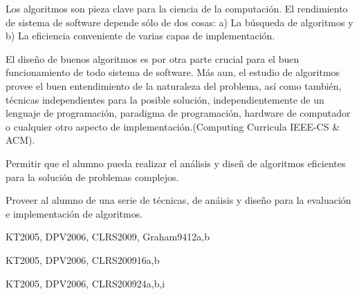 \begin{syllabus}


\begin{justification}
Los algoritmos son pieza clave para la ciencia de la computación. 
El rendimiento de sistema de software
depende sólo de dos cosas: a) La búsqueda de  algoritmos y b) La
eficiencia conveniente de varias capas de implementación.

El diseño de buenos algoritmos es por otra parte crucial para el
buen funcionamiento de todo sistema de software. Más aun, el
estudio  de algoritmos provee el buen entendimiento de la
naturaleza  del problema, así­ como también, técnicas
independientes para la posible solución, independientemente de un
lenguaje de programación, paradigma de programación, hardware de
computador o cualquier otro aspecto de implementación.(Computing
Curricula IEEE-CS \& ACM).
\end{justification}

\begin{goals}
 \item Permitir que el alumno pueda realizar el análisis y diseñ
de algoritmos eficientes para la solución de problemas complejos.

 \item Proveer al alumno de una serie de técnicas, de anáisis y
diseño para la evaluación e implementación de algoritmos.
\end{goals}

\begin{outcomes}
\end{outcomes}

\begin{unit}{\ALBasicAnalysisDef}{KT2005, DPV2006, CLRS2009, Graham94}{12}{a,b}
    \ALBasicAnalysisAllTopics
    \ALBasicAnalysisAllObjectives
\end{unit}

\begin{unit}{\ALFundamentalAlgorithmsDef}{KT2005, DPV2006, CLRS2009}{16}{a,b}
    \ALFundamentalAlgorithmsAllTopics
    \ALFundamentalAlgorithmsAllObjectives
\end{unit}

\begin{unit}{\ALAlgoritmicStrategiesDef}{KT2005, DPV2006, CLRS2009}{24}{a,b,i}
   \ALAlgoritmicStrategiesAllTopics
   \ALAlgoritmicStrategiesAllObjectives
\end{unit}


\end{syllabus}
